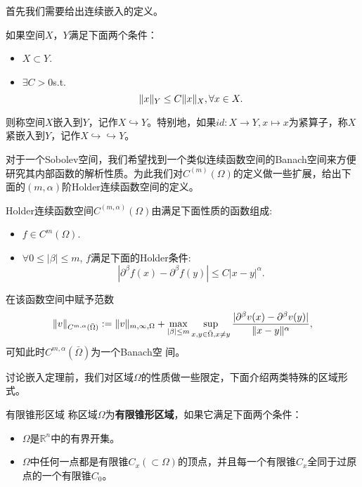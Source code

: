 首先我们需要给出连续嵌入的定义。
\begin{definition}
    如果空间$X$，$Y$满足下面两个条件：
    \begin{itemize}
        \item $X\subset Y$.
        \item $\exists C>0$s.t.
        \begin{equation}
            \|x\|_{Y}\le C\|x\|_{X},\forall x\in X.
        \end{equation}
    \end{itemize}
    则称空间$X$嵌入到$Y$，记作$X\hookrightarrow Y$。特别地，如果$id:X\rightarrow Y,x\mapsto x$为紧算子，称$X$紧嵌入到$Y$，记作$X\hookrightarrow\hookrightarrow Y$。
\end{definition}
对于一个Sobolev空间，我们希望找到一个类似连续函数空间的Banach空间来方便研究其内部函数的解析性质。为此我们对$C^{(m)}(\Omega)$的定义做一些扩展，给出下面的$(m,\alpha)$阶Holder连续函数空间的定义。
\begin{definition}
    Holder连续函数空间$C^{(m,\alpha)}(\Omega)$由满足下面性质的函数组成:
    \begin{itemize}
        \item $f\in C^{m}(\Omega)$.
        \item $\forall 0\le |\beta|\le m$, $f$满足下面的Holder条件:
        \begin{equation}
            |\partial^{\beta}f(x)-\partial^{\beta}f(y)|\le C|x-y|^{\alpha}.
        \end{equation}
    \end{itemize}
    在该函数空间中赋予范数
    \begin{equation}
        \|v\|_{C^{m,\alpha}(\bar{\Omega})}:=\|v\|_{m,\infty,\Omega}+\max_{|\beta|\le m}\sup_{x,y\in\bar{\Omega},x\neq y}\frac{|\partial^{\beta}v(x)-\partial^{\beta}v(y)|}{\|x-y\|^{\alpha}}, 
    \end{equation}
    可知此时$C^{m,\alpha}(\bar{\Omega})$为一个Banach空         间。                               
\end{definition}
讨论嵌入定理前，我们对区域$\Omega$的性质做一些限定，下面介绍两类特殊的区域形式。
\begin{definition}{有限锥形区域}
    称区域$\Omega$为\textbf{有限锥形区域}，如果它满足下面两个条件：
    \begin{itemize}
        \item $\Omega$是$\mathbb{R}^{n}$中的有界开集。
        \item $\Omega$中任何一点都是有限锥$C_{x}(\subset\Omega)$的顶点，并且每一个有限锥$C_{x}$全同于过原点的一个有限锥$C_{0}$。
    \end{itemize}
\end{definition}
